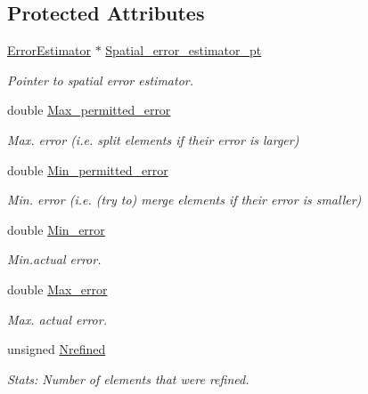 \subsection*{Protected Attributes}
\begin{DoxyCompactItemize}
\item 
\hyperlink{classoomph_1_1ErrorEstimator}{Error\+Estimator} $\ast$ \hyperlink{classoomph_1_1RefineableMeshBase_a9e5f299e0f07b0b78d0147b207f94883}{Spatial\+\_\+error\+\_\+estimator\+\_\+pt}
\begin{DoxyCompactList}\small\item\em Pointer to spatial error estimator. \end{DoxyCompactList}\item 
double \hyperlink{classoomph_1_1RefineableMeshBase_af3a2b9ae35dd65e377032c53c4f25ca9}{Max\+\_\+permitted\+\_\+error}
\begin{DoxyCompactList}\small\item\em Max. error (i.\+e. split elements if their error is larger) \end{DoxyCompactList}\item 
double \hyperlink{classoomph_1_1RefineableMeshBase_ac623d3a2406dc79c517636ad6abad0d3}{Min\+\_\+permitted\+\_\+error}
\begin{DoxyCompactList}\small\item\em Min. error (i.\+e. (try to) merge elements if their error is smaller) \end{DoxyCompactList}\item 
double \hyperlink{classoomph_1_1RefineableMeshBase_aab8dedbf9f239f89f949f7d968195c0c}{Min\+\_\+error}
\begin{DoxyCompactList}\small\item\em Min.\+actual error. \end{DoxyCompactList}\item 
double \hyperlink{classoomph_1_1RefineableMeshBase_aa179661bfb11a786cc84aba4032c97d8}{Max\+\_\+error}
\begin{DoxyCompactList}\small\item\em Max. actual error. \end{DoxyCompactList}\item 
unsigned \hyperlink{classoomph_1_1RefineableMeshBase_a1a35c13c3c37ddc5ac2852217d903459}{Nrefined}
\begin{DoxyCompactList}\small\item\em Stats\+: Number of elements that were refined. \end{DoxyCompactList}\item 

\end{DoxyCompactItemize}
